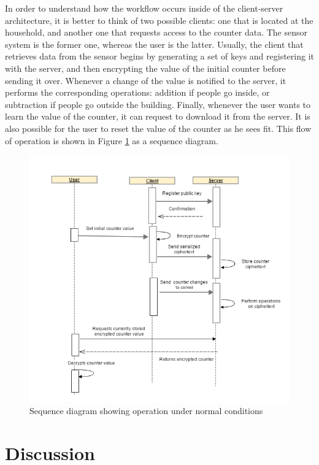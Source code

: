 In order to understand how the workflow occurs inside of the client-server architecture, it is better to think of two possible clients: one that is located at the household, and another one that requests access to the counter data. The sensor system is the former one, whereas the user is the latter. Usually, the client that retrieves data from the sensor begins by generating a set of keys and registering it with the server, and then encrypting the value of the initial counter before sending it over. Whenever a change of the value is notified to the server, it performs the corresponding operations: addition if people go inside, or subtraction if people go outside the building. Finally, whenever the user wants to learn the value of the counter, it can request to download it from the server. It is also possible for the user to reset the value of the counter as he sees fit. This flow of operation is shown in Figure \ref{fig:seqdiag} as a sequence diagram.

\begin{figure}[H]
  \centering
  \includegraphics[scale=0.65]{counter}
  \caption{Sequence diagram showing operation under normal conditions}
  \label{fig:seqdiag}
\end{figure}

\section{Discussion}

